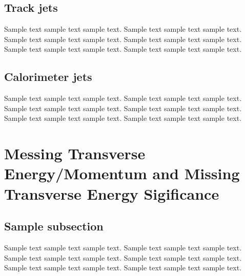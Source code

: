 \subsection{Track jets}
\label{sec:track}
Sample text sample text sample text. Sample text sample text sample text.
Sample text sample text sample text. Sample text sample text sample text.
Sample text sample text sample text. Sample text sample text sample text.

\subsection{Calorimeter jets}
\label{sec:calo}
Sample text sample text sample text. Sample text sample text sample text.
Sample text sample text sample text. Sample text sample text sample text.
Sample text sample text sample text. Sample text sample text sample text.

\section{Messing Transverse Energy/Momentum and Missing Transverse Energy Sigificance}
\label{sec:met}

\subsection{Sample subsection}
Sample text sample text sample text. Sample text sample text sample text.
Sample text sample text sample text. Sample text sample text sample text.
Sample text sample text sample text. Sample text sample text sample text.

